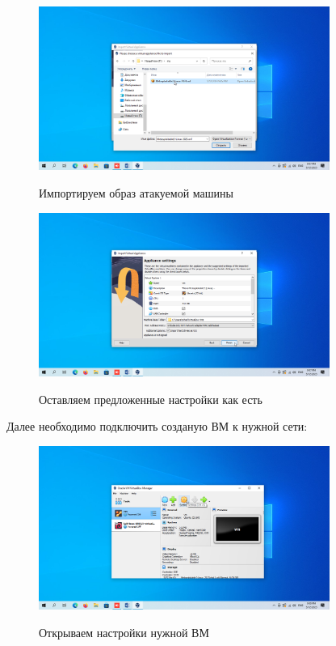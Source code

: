 \documentclass[a4paper]{article}
\begin{document}
  \begin{figure}[H]
    \centering
    \includegraphics[width=0.85\textwidth]{04_0004}
    \label{img:4}
    \caption{Импортируем образ атакуемой машины}
  \end{figure}

  \begin{figure}[H]
    \centering
    \includegraphics[width=0.85\textwidth]{04_0005}
    \label{img:5}
    \caption{Оставляем предложенные настройки как есть}
  \end{figure}

  Далее необходимо подключить созданую ВМ к нужной сети:

  \begin{figure}[H]
    \centering
    \includegraphics[width=0.85\textwidth]{04_0010}
    \label{img:6}
    \caption{Открываем настройки нужной ВМ}
  \end{figure}
\end{document}
